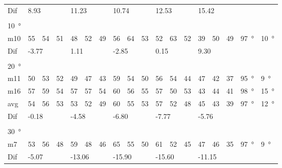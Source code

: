 \begin{table}[H]
\begin{tabular}{l|l|l|l|l|l|l|l|l|l|l|l|l|l|l|l|l|l}
Dif & \multicolumn{3}{l|}{8.93} & \multicolumn{3}{l|}{11.23} & \multicolumn{3}{l|}{10.74} & \multicolumn{3}{l|}{12.53} & \multicolumn{3}{l|}{15.42} & \multicolumn{2}{l}{}  \\ 
 \multicolumn{18}{l}{ } \\                             
\SI{10}{\degree}   & \multicolumn{3}{l|}{} & \multicolumn{3}{l|}{} & \multicolumn{3}{l|}{} & \multicolumn{3}{l|}{} &  \multicolumn{3}{l|}{}  & \multicolumn{2}{l}{}    \\  \hline
m10   &  55    &  54    &  51    & 48     &  52    &  49    & 56     &  64     &  53    &  52     &  63    &  52    & 39 & 50 & 49   & \SI{97}{\degree} & \SI{10}{\degree}  \\ \hline
Dif & \multicolumn{3}{l|}{-3.77} & \multicolumn{3}{l|}{1.11} & \multicolumn{3}{l|}{-2.85} & \multicolumn{3}{l|}{0.15} &  \multicolumn{3}{l|}{9.30}  & \multicolumn{2}{l}{}   \\ 
 \multicolumn{18}{l}{ } \\                             
\SI{20}{\degree}   & \multicolumn{3}{l|}{} & \multicolumn{3}{l|}{} & \multicolumn{3}{l|}{} & \multicolumn{3}{l|}{} &  \multicolumn{3}{l|}{}   & \multicolumn{2}{l}{}   \\  \hline
m11    & 50     &  53    &  52    &  49    & 47     &  43    &  59    &  54     &  50    &   56    &  54    &   44   & 47 & 42 & 37  & \SI{95}{\degree} & \SI{9}{\degree}   \\
m16    & 57     & 59     &  54    &  57    & 57     & 54     &   60   &  56     &  55    &  57     &  50    &  53    & 43 & 44 & 41   & \SI{98}{\degree} & \SI{15}{\degree}  \\ \hline
avg &  54    &  56    &  53    &   53   &  52    &  49    &  60    &   55    &  53    &   57    &  52    &  48    & 45 & 43  &39    & \SI{97}{\degree} & \SI{12}{\degree}  \\ \hline  
Dif & \multicolumn{3}{l|}{-0.18} & \multicolumn{3}{l|}{-4.58} & \multicolumn{3}{l|}{-6.80} & \multicolumn{3}{l|}{-7.77} & \multicolumn{3}{l|}{-5.76} & \multicolumn{2}{l}{}   \\ 
 \multicolumn{18}{l}{ } \\                             
\SI{30}{\degree}   & \multicolumn{3}{l|}{} & \multicolumn{3}{l|}{} & \multicolumn{3}{l|}{} & \multicolumn{3}{l|}{} &  \multicolumn{3}{l|}{}   & \multicolumn{2}{l}{}   \\  \hline
m7    & 53     & 56     & 48     &  59    & 48     &  46    & 65     & 55      &  50    &   61    & 52     &   45   & 47 & 46 & 35   & \SI{97}{\degree} & \SI{9}{\degree}  \\ \hline
Dif & \multicolumn{3}{l|}{-5.07} & \multicolumn{3}{l|}{-13.06} & \multicolumn{3}{l|}{-15.90} & \multicolumn{3}{l|}{-15.60} & \multicolumn{3}{l|}{-11.15}    & \multicolumn{2}{l}{}                              
\end{tabular}
\end{table}




